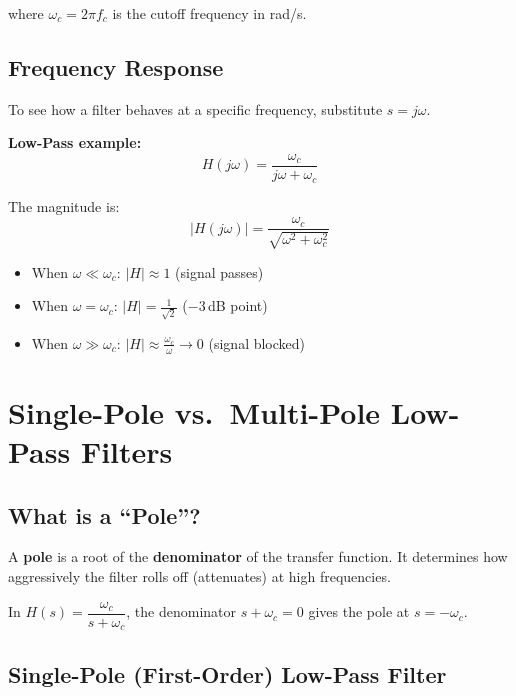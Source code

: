 \documentclass[12pt,a4paper]{article}
\begin{document}
where $\omega_c = 2\pi f_c$ is the cutoff frequency in rad/s.

\subsection{Frequency Response}

To see how a filter behaves at a specific frequency, substitute $s = j\omega$.

\textbf{Low-Pass example:}
\begin{equation}
    H(j\omega) = \frac{\omega_c}{j\omega + \omega_c}
\end{equation}

The magnitude is:
\begin{equation}
    |H(j\omega)| = \frac{\omega_c}{\sqrt{\omega^2 + \omega_c^2}}
\end{equation}

\begin{itemize}
    \item When $\omega \ll \omega_c$: $|H| \approx 1$ \quad (signal passes)
    \item When $\omega = \omega_c$: $|H| = \frac{1}{\sqrt{2}}$ \quad ($-3$\,dB point)
    \item When $\omega \gg \omega_c$: $|H| \approx \frac{\omega_c}{\omega} \to 0$ \quad (signal blocked)
\end{itemize}

\section{Single-Pole vs.\ Multi-Pole Low-Pass Filters}

\subsection{What is a ``Pole''?}

A \textbf{pole} is a root of the \textbf{denominator} of the transfer function. It determines how aggressively the filter rolls off (attenuates) at high frequencies.

In $H(s) = \dfrac{\omega_c}{s + \omega_c}$, the denominator $s + \omega_c = 0$ gives the pole at $s = -\omega_c$.

\subsection{Single-Pole (First-Order) Low-Pass Filter}
\end{document}

